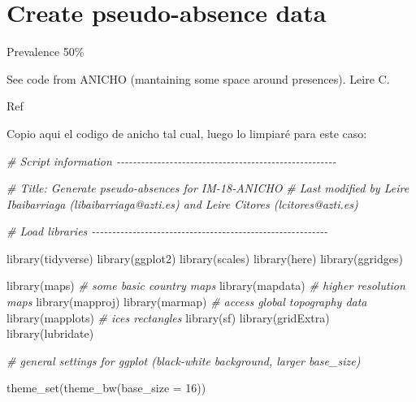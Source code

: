 \documentclass[
]{book}
\newenvironment{Shaded}{\begin{snugshade}}{\end{snugshade}}
\newcommand{\AttributeTok}[1]{\textcolor[rgb]{0.77,0.63,0.00}{#1}}
\newcommand{\CommentTok}[1]{\textcolor[rgb]{0.56,0.35,0.01}{\textit{#1}}}
\newcommand{\DecValTok}[1]{\textcolor[rgb]{0.00,0.00,0.81}{#1}}
\newcommand{\FunctionTok}[1]{\textcolor[rgb]{0.00,0.00,0.00}{#1}}
\newcommand{\NormalTok}[1]{#1}
\begin{document}
\hypertarget{create-pseudo-absence-data}{%
\section{Create pseudo-absence data}\label{create-pseudo-absence-data}}

Prevalence 50\%

See code from ANICHO (mantaining some space around presences). Leire C.

Ref \citep{barbetmassin_etal_2012}

Copio aqui el codigo de anicho tal cual, luego lo limpiaré para este caso:

\begin{Shaded}
\begin{Highlighting}[]
\CommentTok{\# Script information {-}{-}{-}{-}{-}{-}{-}{-}{-}{-}{-}{-}{-}{-}{-}{-}{-}{-}{-}{-}{-}{-}{-}{-}{-}{-}{-}{-}{-}{-}{-}{-}{-}{-}{-}{-}{-}{-}{-}{-}{-}{-}{-}{-}{-}{-}{-}{-}{-}{-}{-}{-}{-}{-}}

\CommentTok{\# Title: Generate pseudo{-}absences for IM{-}18{-}ANICHO}
\CommentTok{\# Last modified by Leire Ibaibarriaga (libaibarriaga@azti.es) and Leire Citores (lcitores@azti.es)}

\CommentTok{\# Load libraries {-}{-}{-}{-}{-}{-}{-}{-}{-}{-}{-}{-}{-}{-}{-}{-}{-}{-}{-}{-}{-}{-}{-}{-}{-}{-}{-}{-}{-}{-}{-}{-}{-}{-}{-}{-}{-}{-}{-}{-}{-}{-}{-}{-}{-}{-}{-}{-}{-}{-}{-}{-}{-}{-}{-}{-}{-}{-}}

\FunctionTok{library}\NormalTok{(tidyverse)}
\FunctionTok{library}\NormalTok{(ggplot2)}
\FunctionTok{library}\NormalTok{(scales)}
\FunctionTok{library}\NormalTok{(here)}
\FunctionTok{library}\NormalTok{(ggridges)}

\FunctionTok{library}\NormalTok{(maps)        }\CommentTok{\# some basic country maps}
\FunctionTok{library}\NormalTok{(mapdata)     }\CommentTok{\# higher resolution maps}
\FunctionTok{library}\NormalTok{(mapproj)}
\FunctionTok{library}\NormalTok{(marmap)      }\CommentTok{\# access global topography data}
\FunctionTok{library}\NormalTok{(mapplots)    }\CommentTok{\# ices rectangles}
\FunctionTok{library}\NormalTok{(sf)}
\FunctionTok{library}\NormalTok{(gridExtra)}
\FunctionTok{library}\NormalTok{(lubridate)}

\CommentTok{\# general settings for ggplot (black{-}white background, larger base\_size)}

\FunctionTok{theme\_set}\NormalTok{(}\FunctionTok{theme\_bw}\NormalTok{(}\AttributeTok{base\_size =} \DecValTok{16}\NormalTok{))}


\end{Highlighting}
\end{Shaded}
\end{document}
